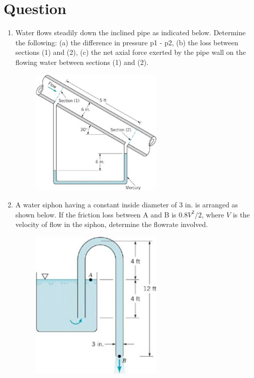 \documentclass[12pt,a4paper]{article}
\newcounter{question}
\newenvironment{questions}{
    \setcounter{question}{0}
    \section*{Question}
    \begin{enumerate}[leftmargin=1.5em,label={\arabic*．}]
}{
    \end{enumerate}
}
\begin{document}
\begin{questions}
\item Water flows steadily down the inclined pipe as indicated below. Determine the following: (a) the difference in pressure p1 - p2, (b) the loss between sections (1) and (2), (c) the net axial force exerted by the pipe wall on the flowing water between sections (1) and (2). 
\begin{figure}[H]
  \centering
  \includegraphics[width=0.6\textwidth]{./figures/10.png}
\end{figure}
\item A water siphon having a constant inside diameter of 3 in. is arranged as shown below. If the friction loss between A and B is $0.8V^2/2$, where $V$ is the velocity of flow in the siphon, determine the flowrate involved.
\begin{figure}[H]
  \centering
  \includegraphics[width=0.6\textwidth]{./figures/11.png}
\end{figure}


\end{questions}
\end{document}
